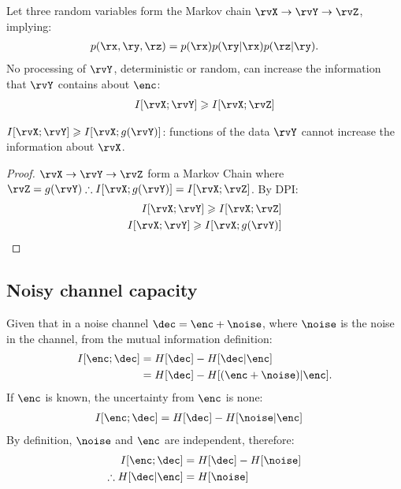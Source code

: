 \begin{theorem}
	 Let three random variables form the Markov chain \(\rvX \rightarrow \rvY \rightarrow \rvZ\), implying:
	\begin{align}
		p(\rx,\ry,\rz)=p(\rx)p(\ry|\rx)p(\rz|\ry).
	\end{align}
	No processing of \(\rvY\), deterministic or random, can increase the information that \(\rvY\) contains about $\enc$:
	\begin{align}
		I[\rvX;\rvY] \geqslant I[\rvX;\rvZ]
	\end{align}
\end{theorem}
\begin{theorem}
	 $I[\rvX;\rvY]\geqslant I[\rvX;g(\rvY)]$: functions of the data $\rvY$ cannot increase the information about $\rvX$.\label{th:reparemetrisation_invariance}
\end{theorem}
\begin{proof}
	\(\rvX \rightarrow \rvY \rightarrow \rvZ\) form a Markov Chain	where $\rvZ=g(\rvY) \therefore I[\rvX;g(\rvY)]=I[\rvX;\rvZ]$. By DPI:\@
	\begin{align}
		I[\rvX;\rvY] \geqslant I[\rvX;\rvZ]\\
		I[\rvX;\rvY] \geqslant I[\rvX;g(\rvY)]
	\end{align}
\end{proof}



\subsection{Noisy channel capacity}
Given that in a noise channel \(\dec = \enc + \noise \), where \(\noise\) is the noise in the channel, from the mutual information definition:
\begin{align}
	I[\enc;\dec]&=H[\dec] - H[\dec|\enc]\\
	&=H[\dec] - H[(\enc + \noise)|\enc].
\end{align}
If $\enc$ is known, the uncertainty from $\enc$ is none:
\begin{align}
	I[\enc;\dec]&=H[\dec] - H[\noise|\enc]
\end{align}
By definition, $\noise$ and $\enc$ are independent, therefore:
\begin{align}
	I[\enc;\dec]&=H[\dec] - H[\noise]\\
	\therefore H[\dec|\enc] &= H[\noise]
\end{align}

